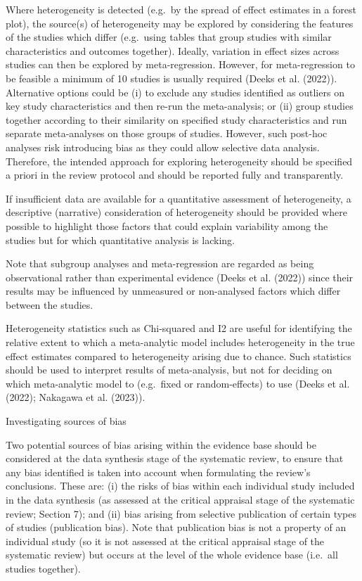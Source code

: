 \documentclass[
  letterpaper,
  DIV=11,
  numbers=noendperiod]{scrreprt}
\begin{document}
Where heterogeneity is detected (e.g.~by the spread of effect estimates
in a forest plot), the source(s) of heterogeneity may be explored by
considering the features of the studies which differ (e.g.~using tables
that group studies with similar characteristics and outcomes together).
Ideally, variation in effect sizes across studies can then be explored
by meta-regression. However, for meta-regression to be feasible a
minimum of 10 studies is usually required (Deeks et al. (2022)).
Alternative options could be (i) to exclude any studies identified as
outliers on key study characteristics and then re-run the meta-analysis;
or (ii) group studies together according to their similarity on
specified study characteristics and run separate meta-analyses on those
groups of studies. However, such post-hoc analyses risk introducing bias
as they could allow selective data analysis. Therefore, the intended
approach for exploring heterogeneity should be specified a priori in the
review protocol and should be reported fully and transparently.

If insufficient data are available for a quantitative assessment of
heterogeneity, a descriptive (narrative) consideration of heterogeneity
should be provided where possible to highlight those factors that could
explain variability among the studies but for which quantitative
analysis is lacking.

Note that subgroup analyses and meta-regression are regarded as being
observational rather than experimental evidence (Deeks et al. (2022))
since their results may be influenced by unmeasured or non-analysed
factors which differ between the studies.

Heterogeneity statistics such as Chi-squared and I2 are useful for
identifying the relative extent to which a meta-analytic model includes
heterogeneity in the true effect estimates compared to heterogeneity
arising due to chance. Such statistics should be used to interpret
results of meta-analysis, but not for deciding on which meta-analytic
model to (e.g.~fixed or random-effects) to use (Deeks et al. (2022);
{Nakagawa et al.} (2023)).

Investigating sources of bias

Two potential sources of bias arising within the evidence base should be
considered at the data synthesis stage of the systematic review, to
ensure that any bias identified is taken into account when formulating
the review's conclusions. These are: (i) the risks of bias within each
individual study included in the data synthesis (as assessed at the
critical appraisal stage of the systematic review; Section 7); and (ii)
bias arising from selective publication of certain types of studies
(publication bias). Note that publication bias is not a property of an
individual study (so it is not assessed at the critical appraisal stage
of the systematic review) but occurs at the level of the whole evidence
base (i.e.~all studies together).
\end{document}
